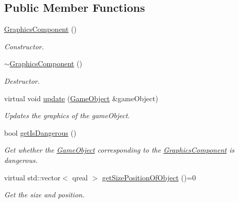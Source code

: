 \subsection*{Public Member Functions}
\begin{DoxyCompactItemize}
\item 
\hypertarget{classGraphicsComponent_a67fc1b715989a5e18d32e26b27a55c50}{\hyperlink{classGraphicsComponent_a67fc1b715989a5e18d32e26b27a55c50}{Graphics\-Component} ()}\label{classGraphicsComponent_a67fc1b715989a5e18d32e26b27a55c50}

\begin{DoxyCompactList}\small\item\em Constructor. \end{DoxyCompactList}\item 
\hypertarget{classGraphicsComponent_abdd6b7255c198efc5ae2817099760293}{\hyperlink{classGraphicsComponent_abdd6b7255c198efc5ae2817099760293}{$\sim$\-Graphics\-Component} ()}\label{classGraphicsComponent_abdd6b7255c198efc5ae2817099760293}

\begin{DoxyCompactList}\small\item\em Destructor. \end{DoxyCompactList}\item 
virtual void \hyperlink{classGraphicsComponent_a744134b79cf11b2ff29fb7802923fda9}{update} (\hyperlink{classGameObject}{Game\-Object} \&game\-Object)
\begin{DoxyCompactList}\small\item\em Updates the graphics of the game\-Object. \end{DoxyCompactList}\item 
bool \hyperlink{classGraphicsComponent_ab670b9ae59d04b87f2602332997ea059}{get\-Is\-Dangerous} ()
\begin{DoxyCompactList}\small\item\em Get whether the \hyperlink{classGameObject}{Game\-Object} corresponding to the \hyperlink{classGraphicsComponent}{Graphics\-Component} is dangerous. \end{DoxyCompactList}\item 
virtual std\-::vector$<$ qreal $>$ \hyperlink{classGraphicsComponent_a653e0474dd66fc1876f405831e121631}{get\-Size\-Position\-Of\-Object} ()=0
\begin{DoxyCompactList}\small\item\em Get the size and position. \end{DoxyCompactList}\end{DoxyCompactItemize}
